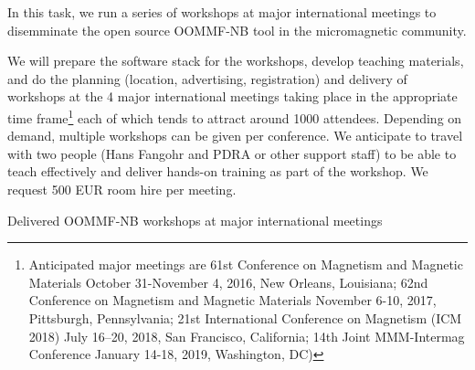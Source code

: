 \begin{workpackage}[id=dissem,wphases=18-48!.5,
  title=Dissemination,
  SARM=1,
  USORM=7]
\begin{tasklist}
\begin{task}[title=OOMMF-NB dissemination workshops,
id=dissemination-of-oommf-nb-workshops]
  
  In this task, we run a series of workshops at major international
  meetings to disemminate the open source OOMMF-NB tool in the
  micromagnetic community.

  We will prepare the software stack for the workshops, develop teaching
  materials, and do the planning (location, advertising, registration)
  and delivery of workshops at the 4 major international meetings
  taking place in the appropriate time frame\footnote{Anticipated
    major meetings are 61st Conference
    on Magnetism and Magnetic Materials October 31-November 4, 2016,
    New Orleans, Louisiana; 62nd Conference on Magnetism and Magnetic
    Materials November 6-10, 2017, Pittsburgh, Pennsylvania; 21st
    International Conference on Magnetism (ICM 2018) July 16–20, 2018,
    San Francisco, California; 14th Joint MMM-Intermag Conference
    January 14-18, 2019, Washington, DC)} each of which tends to
  attract around 1000 attendees. Depending on demand, multiple
  workshops can be given per conference. We anticipate to travel with two
  people (Hans Fangohr and PDRA or other support staff) to be able to teach
  effectively and deliver hands-on training as part of the
  workshop. We request 500 EUR room hire per meeting.
\end{task}
\end{tasklist}

\begin{wpdelivs}
  \begin{wpdeliv}[due=48,id=OOMMF-NB-workshops,dissem=??,nature=??]
      {Delivered OOMMF-NB workshops at major international meetings}
\end{wpdeliv}
\end{wpdelivs}


\end{workpackage}
